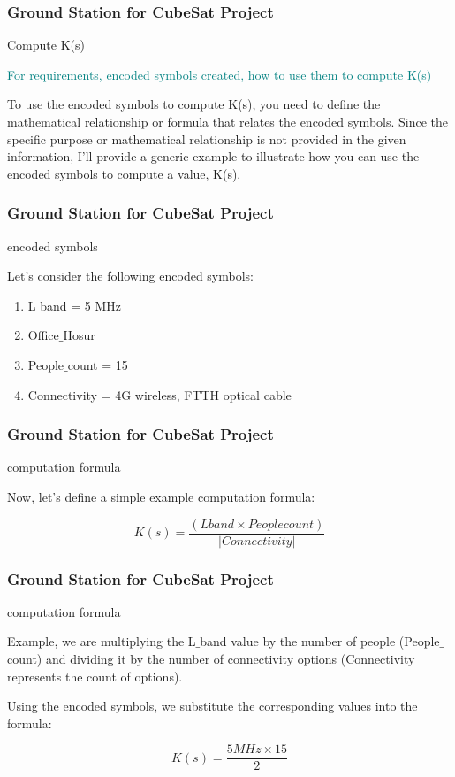 \newpage
\begin{frame}
\frametitle{Ground Station for CubeSat Project }
\begin{block}{Compute K(s)}

\textcolor{teal}{
For requirements, encoded symbols created, how to use them to compute K(s)  }

To use the encoded symbols to compute K(s), you need to define the mathematical relationship or formula that relates the encoded symbols. Since the specific purpose or mathematical relationship is not provided in the given information, I'll provide a generic example to illustrate how you can use the encoded symbols to compute a value, K(s).

\end{block}
\end{frame}


\newpage
\begin{frame}
\frametitle{Ground Station for CubeSat Project }
\begin{block}{encoded symbols}

Let's consider the following encoded symbols: 

\begin{enumerate}
    \item  L$\_$band = 5 MHz
  \item  Office$\_$Hosur
    \item  People$\_$count = 15
      \item  Connectivity = {4G wireless, FTTH optical cable}
\end{enumerate}

\end{block}
\end{frame}


\newpage
\begin{frame}
\frametitle{Ground Station for CubeSat Project }
\begin{block}{computation formula}

Now, let's define a simple example computation formula:

\[
K(s) = \frac{(Lband \times Peoplecount)}{ |Connectivity|} 
\]

\end{block}
\end{frame}


\newpage
\begin{frame}
\frametitle{Ground Station for CubeSat Project }
\begin{block}{computation formula}


Example, we are multiplying the L$\_$band value by the number of people (People$\_$count) and dividing it by the number of connectivity options (Connectivity represents the count of options).

Using the encoded symbols, we substitute the corresponding values into the formula:


 
\[ K(s) =  \frac{5 MHz \times 15}{2} \]

\end{block}
\end{frame}


